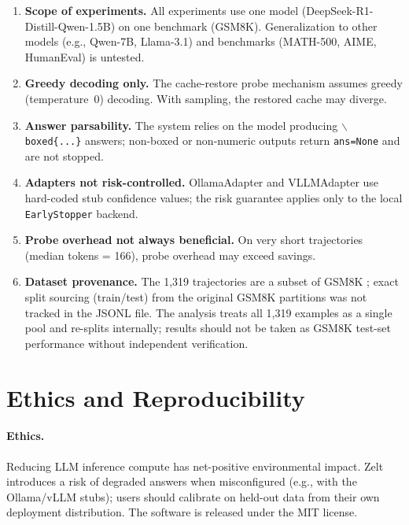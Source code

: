 \documentclass[11pt]{article}
\begin{document}
\begin{enumerate}
  \item \textbf{Scope of experiments.}
        All experiments use one model (DeepSeek-R1-Distill-Qwen-1.5B)
        on one benchmark (GSM8K).  Generalization to other models
        (e.g., Qwen-7B, Llama-3.1) and benchmarks
        (MATH-500, AIME, HumanEval) is untested.
  \item \textbf{Greedy decoding only.}
        The cache-restore probe mechanism assumes greedy (temperature~0)
        decoding.  With sampling, the restored cache may diverge.
  \item \textbf{Answer parsability.}
        The system relies on the model producing \texttt{$\backslash$boxed\{...\}}
        answers; non-boxed or non-numeric outputs return \texttt{ans=None}
        and are not stopped.
  \item \textbf{Adapters not risk-controlled.}
        OllamaAdapter and VLLMAdapter use hard-coded stub confidence values;
        the risk guarantee applies only to the local \texttt{EarlyStopper} backend.
  \item \textbf{Probe overhead not always beneficial.}
        On very short trajectories (median tokens = 166),
        probe overhead may exceed savings.
  \item \textbf{Dataset provenance.}
        The 1{,}319 trajectories are a subset of GSM8K \citep{cobbe2021gsm8k};
        exact split sourcing (train/test) from the original GSM8K
        partitions was not tracked in the JSONL file.
        The analysis treats all 1{,}319 examples as a single pool
        and re-splits internally; results should not be taken as
        GSM8K test-set performance without independent verification.
\end{enumerate}

\section{Ethics and Reproducibility}
\label{sec:ethics}

\paragraph{Ethics.}
Reducing LLM inference compute has net-positive environmental impact.
Zelt introduces a risk of degraded answers when misconfigured
(e.g., with the Ollama/vLLM stubs); users should calibrate on
held-out data from their own deployment distribution.
The software is released under the MIT license.
\end{document}
